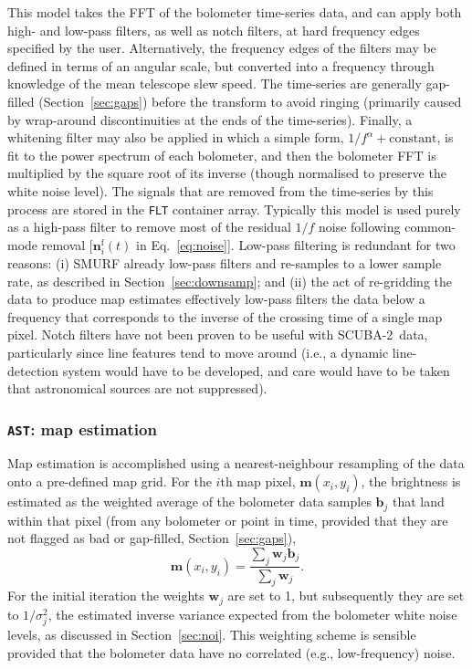 \documentclass[useAMS,usenatbib,nofootinbib]{mn2e}
\newcommand{\scuba}{SCUBA-2}
\newcommand{\model}[1]{\texttt{#1}}
\begin{document}
This model takes the FFT of the bolometer time-series data, and can
apply both high- and low-pass filters, as well as notch filters, at
hard frequency edges specified by the user. Alternatively, the
frequency edges of the filters may be defined in terms of an angular
scale, but converted into a frequency through knowledge of the mean
telescope slew speed. The time-series are generally gap-filled
(Section~\ref{sec:gaps}) before the transform to avoid ringing
(primarily caused by wrap-around discontinuities at the ends of the
time-series). Finally, a whitening filter may also be applied in which
a simple form, $1/f^\alpha + \mathrm{constant}$, is fit to the power
spectrum of each bolometer, and then the bolometer FFT is multiplied
by the square root of its inverse (though normalised to preserve the
white noise level).  The signals that are removed from the time-series
by this process are stored in the \model{FLT} container
array. Typically this model is used purely as a high-pass filter to
remove most of the residual $1/f$ noise following common-mode removal
[$\mathbf{n}^\mathrm{f}_i(t)$ in Eq.~\ref{eq:noise}]. Low-pass
filtering is redundant for two reasons: (i) SMURF already low-pass
filters and re-samples to a lower sample rate, as described in
Section~\ref{sec:downsamp}; and (ii) the act of re-gridding the data
to produce map estimates effectively low-pass filters the data below a
frequency that corresponds to the inverse of the crossing time of a
single map pixel. Notch filters have not been proven to be useful with
\scuba\ data, particularly since line features tend to move around
(i.e., a dynamic line-detection system would have to be developed, and
care would have to be taken that astronomical sources are not
suppressed).

\subsubsection{\model{AST}: map estimation}
\label{sec:ast}

Map estimation is accomplished using a nearest-neighbour resampling of
the data onto a pre-defined map grid. For the $i$th map pixel,
$\mathbf{m}(x_i,y_i)$, the brightness is estimated as the weighted
average of the bolometer data samples $\mathbf{b}_j$ that land within
that pixel (from any bolometer or point in time, provided that they
are not flagged as bad or gap-filled, Section~\ref{sec:gaps}),
%
\begin{equation}
  \mathbf{m}(x_i,y_i) = \frac{\sum_j \mathbf{w}_j \mathbf{b}_j }
                             { \sum_j \mathbf{w}_j } .
\end{equation}
%
For the initial iteration the weights $\mathbf{w}_j$ are set to 1, but
subsequently they are set to $1/\sigma_j^2$, the estimated inverse
variance expected from the bolometer white noise levels, as discussed
in Section~\ref{sec:noi}. This weighting scheme is sensible provided
that the bolometer data have no correlated (e.g., low-frequency)
noise.
\end{document}
